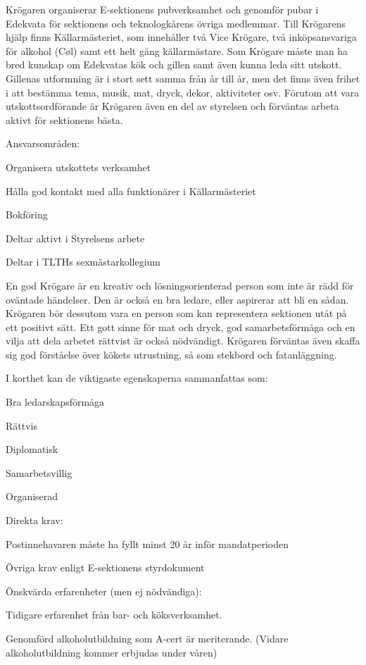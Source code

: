 \documentclass[10pt]{article}
\def\post{Krögare}
\def\doctitle{Kravprofil för \post}
\begin{document}
\heading{\doctitle}

Krögaren organiserar E-sektionens pubverksamhet och genomför pubar i Edekvata för sektionens och teknologkårens övriga medlemmar. Till Krögarens hjälp finns Källarmästeriet, som innehåller två Vice Krögare, två inköpsansvariga för alkohol (Cøl) samt ett helt gäng källarmästare. Som Krögare måste man ha bred kunskap om Edekvatas kök och gillen samt även kunna leda sitt utskott. Gillenas utformning är i stort sett samma från år till år, men det finns även frihet i att bestämma tema, musik, mat, dryck, dekor, aktiviteter osv. Förutom att vara utskottsordförande är Krögaren även en del av styrelsen och förväntas arbeta aktivt för sektionens bästa.

Ansvarsområden:
\begin{dashlist}
    \item Organisera utskottets verksamhet
    \item Hålla god kontakt med alla funktionärer i Källarmästeriet
    \item Bokföring
    \item Deltar aktivt i Styrelsens arbete
    \item Deltar i TLTHs sexmästarkollegium
\end{dashlist}

En god Krögare är en kreativ och lösningsorienterad person som inte är rädd för oväntade
händelser. Den är också en bra ledare, eller aspirerar att bli en sådan. Krögaren bör dessutom
vara en person som kan representera sektionen utåt på ett positivt sätt. Ett gott sinne för mat och dryck, god samarbetsförmåga och en vilja att dela arbetet rättvist är också nödvändigt. Krögaren förväntas även skaffa sig god förståelse över kökets utrustning, så som stekbord och fatanläggning.

I korthet kan de viktigaste egenskaperna sammanfattas som:
\begin{dashlist}
    \item Bra ledarskapsförmåga
    \item Rättvis
    \item Diplomatisk
    \item Samarbetsvillig
    \item Organiserad
\end{dashlist}

Direkta krav:
\begin{dashlist}
    \item Postinnehavaren måste ha fyllt minst 20 år inför mandatperioden
    \item Övriga krav enligt E-sektionens styrdokument
\end{dashlist}

Önskvärda erfarenheter (men ej nödvändiga):
\begin{dashlist}
    \item Tidigare erfarenhet från bar- och köksverksamhet.
    \item Genomförd alkoholutbildning som A-cert är meriterande. (Vidare alkoholutbildning kommer erbjudas under våren)
\end{dashlist}
\end{document}
